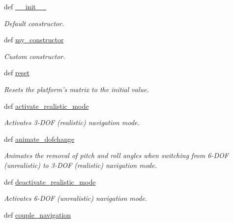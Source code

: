 \begin{DoxyCompactItemize}
\item 
def \hyperlink{classlib_1_1Navigation_1_1Navigation_a64ca778d811fce03565e72a950db1333}{\-\_\-\-\_\-init\-\_\-\-\_\-}
\begin{DoxyCompactList}\small\item\em \-Default constructor. \end{DoxyCompactList}\item 
def \hyperlink{classlib_1_1Navigation_1_1Navigation_af33463f7323af7fe77596d5764c0e026}{my\-\_\-constructor}
\begin{DoxyCompactList}\small\item\em \-Custom constructor. \end{DoxyCompactList}\item 
def \hyperlink{classlib_1_1Navigation_1_1Navigation_a0bb07589d747489b07c098e22a1b9fa4}{reset}
\begin{DoxyCompactList}\small\item\em \-Resets the platform's matrix to the initial value. \end{DoxyCompactList}\item 
def \hyperlink{classlib_1_1Navigation_1_1Navigation_aca5510d34f58c06a4009b871e9c0c024}{activate\-\_\-realistic\-\_\-mode}
\begin{DoxyCompactList}\small\item\em \-Activates 3-\/\-D\-O\-F (realistic) navigation mode. \end{DoxyCompactList}\item 
def \hyperlink{classlib_1_1Navigation_1_1Navigation_a7a7f120eeb6f66fe9fe5cbba78d3714a}{animate\-\_\-dofchange}
\begin{DoxyCompactList}\small\item\em \-Animates the removal of pitch and roll angles when switching from 6-\/\-D\-O\-F (unrealistic) to 3-\/\-D\-O\-F (realistic) navigation mode. \end{DoxyCompactList}\item 
def \hyperlink{classlib_1_1Navigation_1_1Navigation_a7053f5eb9d3415973efe213ecfd79074}{deactivate\-\_\-realistic\-\_\-mode}
\begin{DoxyCompactList}\small\item\em \-Activates 6-\/\-D\-O\-F (unrealistic) navigation mode. \end{DoxyCompactList}\item 
def \hyperlink{classlib_1_1Navigation_1_1Navigation_ac860e4179d72e5a0f262bc470031ba67}{couple\-\_\-navigation}

\end{DoxyCompactItemize}
